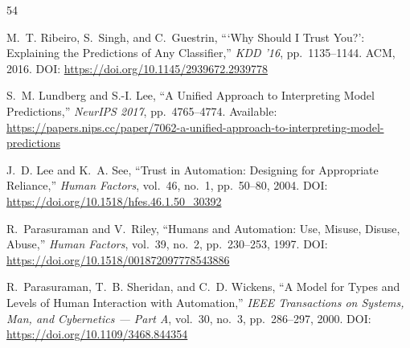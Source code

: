 \documentclass[acmlarge,nonacm,screen]{acmart}
\begin{document}
\begin{thebibliography}{54}

M.~T. Ribeiro, S.~Singh, and C.~Guestrin,
```Why Should I Trust You?': Explaining the Predictions of Any Classifier,''
\textit{KDD '16}, pp.~1135--1144. ACM, 2016.
\newline DOI: \url{https://doi.org/10.1145/2939672.2939778}

S.~M. Lundberg and S.-I. Lee,
``A Unified Approach to Interpreting Model Predictions,''
\textit{NeurIPS 2017}, pp.~4765--4774.
\newline Available: \url{https://papers.nips.cc/paper/7062-a-unified-approach-to-interpreting-model-predictions}


J.~D. Lee and K.~A. See,
``Trust in Automation: Designing for Appropriate Reliance,''
\textit{Human Factors}, vol.~46, no.~1, pp.~50--80, 2004.
\newline DOI: \url{https://doi.org/10.1518/hfes.46.1.50_30392}

R.~Parasuraman and V.~Riley,
``Humans and Automation: Use, Misuse, Disuse, Abuse,''
\textit{Human Factors}, vol.~39, no.~2, pp.~230--253, 1997.
\newline DOI: \url{https://doi.org/10.1518/001872097778543886}


R.~Parasuraman, T.~B. Sheridan, and C.~D. Wickens,
``A Model for Types and Levels of Human Interaction with Automation,''
\textit{IEEE Transactions on Systems, Man, and Cybernetics --- Part A}, vol.~30, no.~3, pp.~286--297, 2000.
\newline DOI: \url{https://doi.org/10.1109/3468.844354}


\end{thebibliography}
\end{document}
